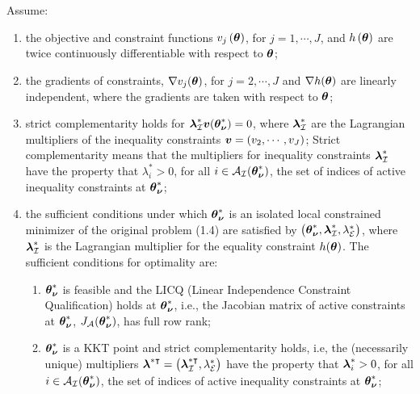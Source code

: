 \begin{theorem}
	Assume:
	\begin{enumerate}
		\item the objective and constraint functions $v_j\left(\boldsymbol{\theta}\right)$, for $j = 1, \cdots, J$, and $h\left(\boldsymbol{\theta}\right)$ are twice continuously differentiable with respect to $\boldsymbol{\theta}$;
		\item the gradients of constraints, $\nabla v_j(\boldsymbol{\theta})$, for $j = 2, \cdots, J$ and $\nabla h(\boldsymbol{\theta})$ are linearly independent, where the gradients are taken with respect to $\boldsymbol{\theta}$;
		\item strict complementarity holds for  $\boldsymbol{\lambda}_{\mathcal{I}}^* \boldsymbol{v}(\boldsymbol{\theta}_{\boldsymbol{\nu}}^*) = 0$, where $\boldsymbol{\lambda}_{\mathcal{I}}^*$ are the Lagrangian multipliers of the inequality constraints $\boldsymbol{v} = \left(v_2, \cdots, v_J\right)$; Strict complementarity means that the multipliers for inequality constraints $\boldsymbol{\lambda}_{\mathcal{I}}^{*}$ have the property that $\lambda_i^* > 0$, for all $i  \in \mathcal{A}_{\mathcal{I}}(\boldsymbol{\theta}_{\boldsymbol{\nu}}^*)$, the set of indices of active inequality constraints at $\boldsymbol{\theta}_{\boldsymbol{\nu}}^*$;		\item the sufficient conditions under which $\boldsymbol{\theta}_{\boldsymbol{\nu}}^*$ is an isolated local constrained minimizer of the original problem (1.4) are satisfied by $\left(\boldsymbol{\theta}^*_{\boldsymbol{\nu}}, \boldsymbol{\lambda}_{\mathcal{I}}^*, \lambda_{\mathcal{E}}^*\right)$, where $\boldsymbol{\lambda}_{\mathcal{I}}^*$ is the Lagrangian multiplier for the equality constraint $h(\boldsymbol{\theta})$. The sufficient conditions for optimality are:
		\begin{enumerate}
			\item $\boldsymbol{\theta}_{\boldsymbol{\nu}}^*$ is feasible and the LICQ (Linear Independence Constraint Qualification) holds at $\boldsymbol{\theta}_{\boldsymbol{\nu}}^*$, i.e., the Jacobian matrix of active constraints at $\boldsymbol{\theta}_{\boldsymbol{\nu}}^*$, $J_{\mathcal{A}}(\boldsymbol{\theta}_{\boldsymbol{\nu}}^*)$, has full row rank;
			\item $\boldsymbol{\theta}_{\boldsymbol{\nu}}^*$ is a KKT point and strict complementarity holds, i.e, the (necessarily unique) multipliers $\boldsymbol{\lambda}^{*\intercal} =  \left(\boldsymbol{\lambda}_{\mathcal{I}}^{*\intercal}, \lambda_{\mathcal{E}}^*\right)$ have the property that $\boldsymbol{\lambda}_i^* > 0$, for all $i  \in \mathcal{A}_{\mathcal{I}}(\boldsymbol{\theta}_{\boldsymbol{\nu}}^*)$, the set of indices of active inequality constraints at $\boldsymbol{\theta}_{\boldsymbol{\nu}}^*$;

\end{enumerate}
\end{enumerate}
\end{theorem}
